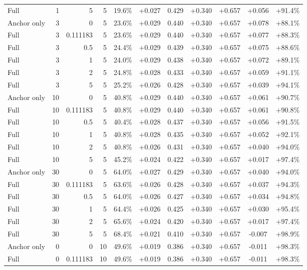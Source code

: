 \begin{table}[htbp]
\begin{tabular}{lrrrccccccc}
Full & 1 & 5 & 5 & 19.6\% & +0.027 & 0.429 & +0.340 & +0.657 & +0.056 & +91.4\% \\
Anchor only & 3 & 0 & 5 & 23.6\% & +0.029 & 0.440 & +0.340 & +0.657 & +0.078 & +88.1\% \\
Full & 3 & 0.111183 & 5 & 23.6\% & +0.029 & 0.440 & +0.340 & +0.657 & +0.077 & +88.3\% \\
Full & 3 & 0.5 & 5 & 24.4\% & +0.029 & 0.439 & +0.340 & +0.657 & +0.075 & +88.6\% \\
Full & 3 & 1 & 5 & 24.0\% & +0.029 & 0.438 & +0.340 & +0.657 & +0.072 & +89.1\% \\
Full & 3 & 2 & 5 & 24.8\% & +0.028 & 0.433 & +0.340 & +0.657 & +0.059 & +91.1\% \\
Full & 3 & 5 & 5 & 25.2\% & +0.026 & 0.428 & +0.340 & +0.657 & +0.039 & +94.1\% \\
Anchor only & 10 & 0 & 5 & 40.8\% & +0.029 & 0.440 & +0.340 & +0.657 & +0.061 & +90.7\% \\
Full & 10 & 0.111183 & 5 & 40.8\% & +0.029 & 0.440 & +0.340 & +0.657 & +0.061 & +90.8\% \\
Full & 10 & 0.5 & 5 & 40.4\% & +0.028 & 0.437 & +0.340 & +0.657 & +0.056 & +91.5\% \\
Full & 10 & 1 & 5 & 40.8\% & +0.028 & 0.435 & +0.340 & +0.657 & +0.052 & +92.1\% \\
Full & 10 & 2 & 5 & 40.8\% & +0.026 & 0.431 & +0.340 & +0.657 & +0.040 & +94.0\% \\
Full & 10 & 5 & 5 & 45.2\% & +0.024 & 0.422 & +0.340 & +0.657 & +0.017 & +97.4\% \\
Anchor only & 30 & 0 & 5 & 64.0\% & +0.027 & 0.429 & +0.340 & +0.657 & +0.040 & +94.0\% \\
Full & 30 & 0.111183 & 5 & 63.6\% & +0.026 & 0.428 & +0.340 & +0.657 & +0.037 & +94.3\% \\
Full & 30 & 0.5 & 5 & 64.0\% & +0.026 & 0.427 & +0.340 & +0.657 & +0.034 & +94.8\% \\
Full & 30 & 1 & 5 & 64.4\% & +0.026 & 0.425 & +0.340 & +0.657 & +0.030 & +95.4\% \\
Full & 30 & 2 & 5 & 65.6\% & +0.024 & 0.420 & +0.340 & +0.657 & +0.017 & +97.4\% \\
Full & 30 & 5 & 5 & 68.4\% & +0.021 & 0.410 & +0.340 & +0.657 & -0.007 & +98.9\% \\
Anchor only & 0 & 0 & 10 & 49.6\% & +0.019 & 0.386 & +0.340 & +0.657 & -0.011 & +98.3\% \\
Full & 0 & 0.111183 & 10 & 49.6\% & +0.019 & 0.386 & +0.340 & +0.657 & -0.011 & +98.3\% \\

\end{tabular}
\end{table}

